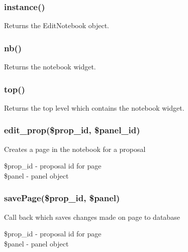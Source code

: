 \documentclass{article}
\begin{document}
\subsubsection*{instance()\label{EditNotebook_instance_}}


Returns the EditNotebook object.

\subsubsection*{nb()\label{EditNotebook_nb_}}


Returns the notebook widget.

\subsubsection*{top()\label{EditNotebook_top_}}


Returns the top level which contains the notebook widget.

\subsubsection*{edit\_prop(\$prop\_id, \$panel\_id)\label{EditNotebook_edit_prop_prop_id_panel_id_}}


Creates a page in the notebook for a proposal

\begin{description}

\item[{\$prop\_id - proposal id for page}] \mbox{}
\item[{\$panel - panel object}] \mbox{}\end{description}
\subsubsection*{savePage(\$prop\_id, \$panel)\label{EditNotebook_savePage_prop_id_panel_}}


Call back which saves changes made on page to database

\begin{description}

\item[{\$prop\_id - proposal id for page}] \mbox{}
\item[{\$panel - panel object}] \mbox{}\end{description}
\end{document}
